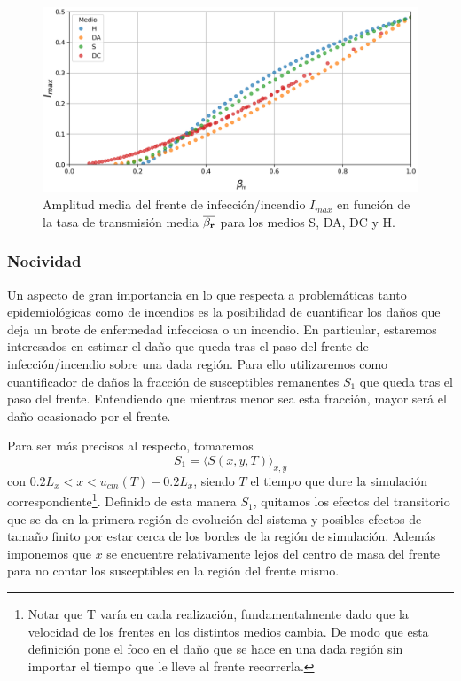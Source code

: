 \begin{figure}[h]
    \centering
    \includegraphics[width=\imsizeL]{I_max.png}
    \caption{Amplitud media del frente de infección/incendio $I_{max}$ en función de la tasa de transmisión media $\overline{\beta_{\vb r}}$ para los medios S, DA, 
    DC y H.}
    \label{fig:I_all}
\end{figure}


\newpage
\subsubsection*{Nocividad}

Un aspecto de gran importancia en lo que respecta a problemáticas tanto epidemiológicas como de incendios es la posibilidad de cuantificar los daños que
deja un brote de enfermedad infecciosa o un incendio. En particular, estaremos interesados en estimar el daño que queda tras el paso del frente de infección/incendio sobre una dada región. Para ello utilizaremos como cuantificador de daños la fracción de susceptibles remanentes $S_1$ que queda tras el paso del frente. Entendiendo que mientras menor sea esta fracción, mayor será el daño ocasionado por el frente.

Para ser más precisos al respecto, tomaremos 
\[S_1=\langle S(x,y,T)\rangle_{x,y}\]
con $0.2L_x<x<u_{cm}(T)-0.2L_x$, siendo $T$ el tiempo que dure la simulación correspondiente\footnote{Notar que T varía en cada realización, fundamentalmente dado que la velocidad de los frentes en los distintos medios cambia. De modo que esta definición pone el foco en el daño que se hace en una dada región sin importar el tiempo que le lleve al frente recorrerla.}. Definido de esta manera $S_1$, quitamos los efectos del transitorio que se da en la primera región de evolución del sistema y posibles efectos de tamaño finito por estar cerca de los bordes de la región de simulación. Además imponemos que $x$ se encuentre relativamente lejos del centro de masa del frente para no contar los susceptibles en la región del frente mismo.

